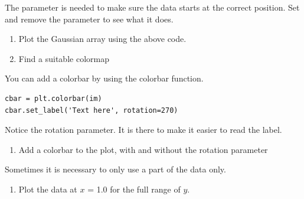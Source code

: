 \documentclass{article}
\begin{document}
The  parameter is needed to make sure the data starts at the correct position.
Set  and remove the parameter to see what it does.

\begin{enumerate}[resume]

    \item Plot the Gaussian array using the above code.

    \item Find a suitable colormap

\end{enumerate}

You can add a colorbar by using the colorbar function.

\begin{lstlisting}
cbar = plt.colorbar(im)
cbar.set_label('Text here', rotation=270)
\end{lstlisting}

Notice the rotation parameter. It is there to make it easier to read the label.

\begin{enumerate}[resume]

    \item Add a colorbar to the plot, with and without the rotation parameter

\end{enumerate}

Sometimes it is necessary to only use a part of the data only.

\begin{enumerate}[resume]

    \item Plot the data at $x$ = 1.0 for the full range of $y$.

\end{enumerate}


\end{document}
